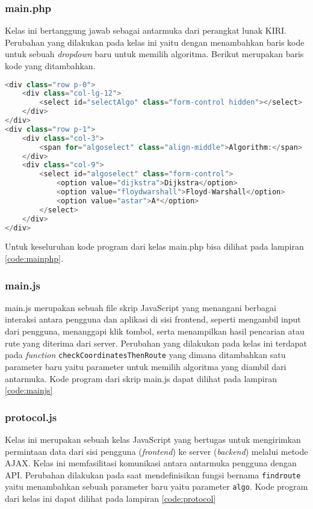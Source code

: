 \subsubsection{main.php}
Kelas ini bertanggung jawab sebagai antarmuka dari perangkat lunak KIRI. Perubahan yang dilakukan pada kelas ini yaitu dengan menambahkan baris kode untuk sebuah \textit{dropdown} baru untuk memilih algoritma. Berikut merupakan baris kode yang ditambahkan.

\begin{lstlisting}[language=Java, caption=main.php, basicstyle=\small\ttfamily]
<div class="row p-0">
	<div class="col-lg-12">
		<select id="selectAlgo" class="form-control hidden"></select>
	</div>
</div>
<div class="row p-1">
	<div class="col-3">
		<span for="algoselect" class="align-middle">Algorithm:</span>
	</div>
	<div class="col-9">
		<select id="algoselect" class="form-control">
			<option value="dijkstra">Dijkstra</option>
			<option value="floydwarshall">Floyd-Warshall</option>
			<option value="astar">A*</option>
		</select>
	</div>
</div>
\end{lstlisting}
\noindent
Untuk keseluruhan kode program dari kelas main.php bisa dilihat pada lampiran \ref{code:mainphp}.
\subsubsection{main.js}
main.js merupakan sebuah file skrip JavaScript yang menangani berbagai interaksi antara pengguna dan aplikasi di sisi frontend, seperti mengambil input dari pengguna, menanggapi klik tombol, serta menampilkan hasil pencarian atau rute yang diterima dari server. Perubahan yang dilakukan pada kelas ini terdapat pada \textit{function} \texttt{checkCoordinatesThenRoute} yang dimana ditambahkan satu parameter baru yaitu parameter untuk memilih algoritma yang diambil dari antarmuka. Kode program dari skrip main.js dapat dilihat pada lampiran \ref{code:mainjs}

\subsubsection{protocol.js}
Kelas ini merupakan sebuah kelas JavaScript yang bertugas untuk mengirimkan permintaan data dari sisi pengguna (\textit{frontend}) ke server (\textit{backend}) melalui metode AJAX. Kelas ini memfasilitasi komunikasi antara antarmuka pengguna dengan API. Perubahan dilakukan pada saat mendefinisikan fungsi bernama \texttt{findroute} yaitu menambahkan sebuah parameter baru yaitu parameter \texttt{algo}. Kode program dari kelas ini dapat dilihat pada lampiran \ref{code:protocol}


